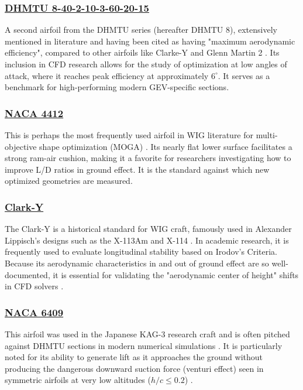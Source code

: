 \subsubsection*{\underline{DHMTU 8-40-2-10-3-60-20-15}}

A second airfoil from the DHMTU series (hereafter DHMTU 8), extensively mentioned in literature and having been cited as having "maximum aerodynamic efficiency", compared to other airfoils like Clarke-Y and Glenn Martin 2 \cite{IJET_GEV_investigation}. Its inclusion in CFD research allows for the study of optimization at low angles of attack, where it reaches peak efficiency at approximately $6^{\circ}$. It serves as a benchmark for high-performing modern GEV-specific sections.

\subsubsection*{\underline{NACA 4412}}

This is perhaps the most frequently used airfoil in WIG literature for multi-objective shape optimization (MOGA) \cite{HINDAWI_shape_optimization}. Its nearly flat lower surface facilitates a strong ram-air cushion, making it a favorite for researchers investigating how to improve L/D ratios in ground effect. It is the standard against which new optimized geometries are measured.

\subsubsection*{\underline{Clark-Y}}

The Clark-Y is a historical standard for WIG craft, famously used in Alexander Lippisch's designs such as the X-113Am and X-114 \cite{ISU_thesis}. In academic research, it is frequently used to evaluate longitudinal stability based on Irodov's Criteria. Because its aerodynamic characteristics in and out of ground effect are so well-documented, it is essential for validating the "aerodynamic center of height" shifts in CFD solvers \cite{Longitudinal_stability_study}.\\

\subsubsection*{\underline{NACA 6409}}

This airfoil was used in the Japanese KAG-3 research craft and is often pitched against DHMTU sections in modern numerical simulations \cite{IJET_GEV_investigation}. It is particularly noted for its ability to generate lift as it approaches the ground without producing the dangerous downward suction force (venturi effect) seen in symmetric airfoils at very low altitudes ($h/c \leq 0.2$) \cite{ASME_CFD_simulation}.

